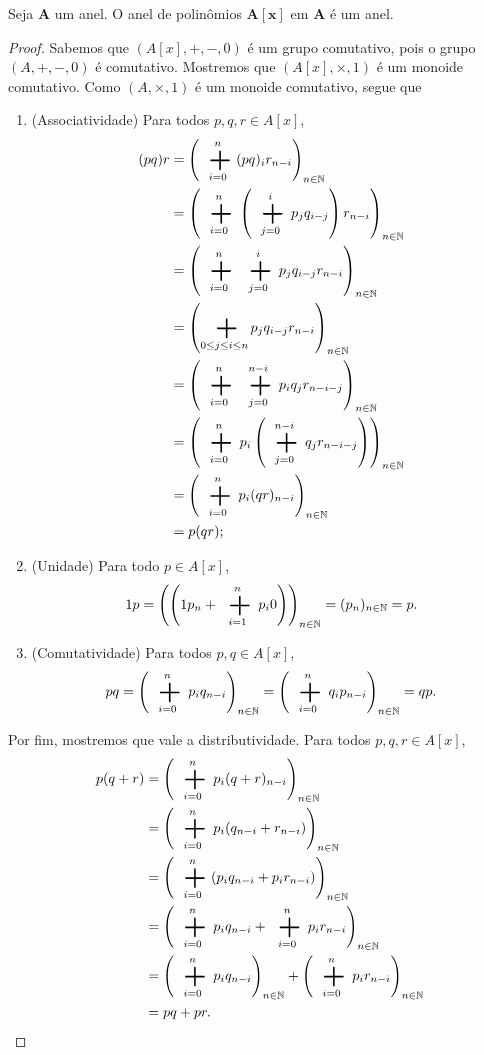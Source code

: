\begin{proposition}
Seja $\bm A$ um anel. O anel de polinômios $\bm{A[x]}$ em $\bm A$ é um anel.
\end{proposition}
\begin{proof}
Sabemos que $(A[x],+,-,0)$ é um grupo comutativo, pois o grupo $(A,+,-,0)$ é comutativo. Mostremos que $(A[x],\times,1)$ é um monoide comutativo. Como $(A,\times,1)$ é um monoide comutativo, segue que
	\begin{enumerate}
	\item (Associatividade) Para todos $p,q,r \in A[x]$,
		\begin{align*}
		(pq)r &= \left(\sum_{i=0}^n (pq)_i r_{n-i}\right)_{n \in \N} \\
			&= \left(\sum_{i=0}^n \left(\sum_{j=0}^i p_j q_{i-j}\right) r_{n-i}\right)_{n \in \N} \\
			&= \left(\sum_{i=0}^n \sum_{j=0}^i p_j q_{i-j} r_{n-i} \right)_{n \in \N} \\
			&= \left(\sum_{0 \leq j \leq i \leq n} p_j q_{i-j} r_{n-i} \right)_{n \in \N} \\
			&= \left(\sum_{i=0}^n \sum_{j=0}^{n-i} p_i q_j r_{n-i-j} \right)_{n \in \N}\\
			&= \left(\sum_{i=0}^n p_i \left(\sum_{j=0}^{n-i} q_j r_{n-i-j}\right)\right)_{n \in \N}\\
			&= \left(\sum_{i=0}^n p_i (qr)_{n-i}\right)_{n \in \N}\\
			&= p(qr);
		\end{align*}
	\item (Unidade) Para todo $p \in A[x]$,
		\begin{equation*}
		1p = \left(\left(1p_n + \sum_{i=1}^{n} p_i 0 \right)\right)_{n \in \N} = (p_n)_{n \in \N} = p.
		\end{equation*}
	\item (Comutatividade) Para todos $p,q \in A[x]$,
		\begin{equation*}
		pq = \left(\sum_{i=0}^n p_i q_{n-i}\right)_{n \in \N} = \left(\sum_{i=0}^n q_i p_{n-i}\right)_{n \in \N} = qp.
		\end{equation*}
	\end{enumerate}
Por fim, mostremos que vale a distributividade. Para todos $p,q,r \in A[x]$,
	\begin{align*}
	p (q + r) &= \left(\sum_{i=0}^n p_i (q+r)_{n-i}\right)_{n \in \N} \\
		&=  \left(\sum_{i=0}^n p_i (q_{n-i}+r_{n-i})\right)_{n \in \N} \\
		&=  \left(\sum_{i=0}^n (p_i q_{n-i} + p_i r_{n-i})\right)_{n \in \N} \\
		&=  \left(\sum_{i=0}^n p_i q_{n-i} + \sum_{i=0}^n p_i r_{n-i}\right)_{n \in \N} \\
		&= \left(\sum_{i=0}^n p_i q_{n-i}\right)_{n \in \N} + \left(\sum_{i=0}^n p_i r_{n-i}\right)_{n \in \N} \\
		&= pq+pr.
	\end{align*}
\end{proof}

